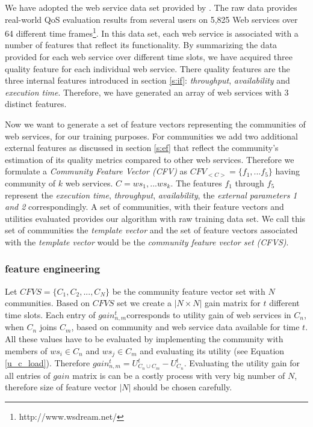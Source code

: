 \documentclass[10pt,journal,cspaper,compsoc]{IEEEtran}
\begin{document}
We have adopted the web service data set provided by \cite{10.1109/ISSRE.2011.17}. The raw data provides real-world QoS evaluation results from several users on 5,825 Web services over 64 different time frames\footnote{http://www.wsdream.net/}. In this data set, each web service is associated with a number of features that reflect its functionality. By summarizing the data provided for each web service over different time slots, we have acquired three quality feature for each individual web service. There quality features are the three internal features introduced in section \ref{s:if}: \emph{throughput}, \emph{availability} and \emph{execution time}. 
Therefore, we have generated an array of web services with 3 distinct features. 

Now we want to generate a set of feature vectors representing the communities of web services, for our training purposes. For communities we add two additional external features as discussed in section \ref{s:ef} that reflect the community's estimation of its quality metrics compared to other web services. Therefore we formulate a \emph{Community Feature Vector (CFV)} as $CFV_{<C>} = \{f_1,...f_5\}$ having community of $k$ web services. $C = {ws_1,...ws_k}$. The features $f_1$ through $f_5$ represent the \emph{execution time}, \emph{throughput}, \emph{availability}, the \emph{external parameters 1 and 2} correspondingly. A set of communities, with their feature vectors and utilities evaluated provides our algorithm with raw training data set. We call this set of communities the \emph{template vector} and the set of feature vectors associated with the \emph{template vector} would be the \emph{community feature vector set (CFVS)}.

\subsubsection{feature engineering}\label{sss:feng}
Let $CFVS = \{C_1, C_2,..., C_N\}$ be the community feature vector set with $N$ communities. Based on $CFVS$ set we create a $|N \times N|$ gain matrix for $t$ different time slots. Each entry of $gain_{n,m}^{t}$corresponds to utility gain of web services in $C_n$, when $C_n$ joins $C_m$, based on community and web service data available for time $t$. All these values have to be evaluated by implementing the community with members of $ws_i \in C_n$ and $ws_j \in C_m$ and evaluating its utility (see Equation \ref{u_c_load}). Therefore $gain_{n,m}^{t} = U_{C_n \cup C_m}^{t} - U_{C_{n}}^{t}$. Evaluating the utility gain for all entries of $gain$ matrix is can be a costly process with very big number of $N$, therefore size of feature vector $|N|$ should be chosen carefully. 
\end{document}
